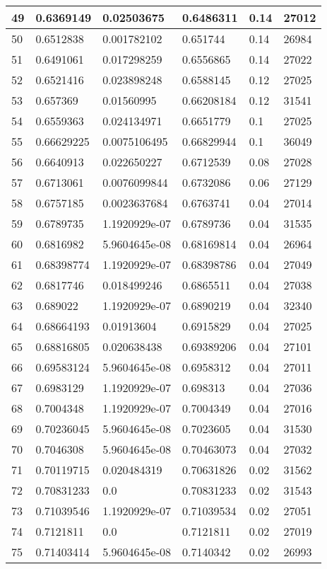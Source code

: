 \begin{longtable}{|l|l|l|l|l|l|}
49 & 0.6369149 & 0.02503675 & 0.6486311 & 0.14 & 27012 \\ \hline 
50 & 0.6512838 & 0.001782102 & 0.651744 & 0.14 & 26984 \\ \hline 
51 & 0.6491061 & 0.017298259 & 0.6556865 & 0.14 & 27022 \\ \hline 
52 & 0.6521416 & 0.023898248 & 0.6588145 & 0.12 & 27025 \\ \hline 
53 & 0.657369 & 0.01560995 & 0.66208184 & 0.12 & 31541 \\ \hline 
54 & 0.6559363 & 0.024134971 & 0.6651779 & 0.1 & 27025 \\ \hline 
55 & 0.66629225 & 0.0075106495 & 0.66829944 & 0.1 & 36049 \\ \hline 
56 & 0.6640913 & 0.022650227 & 0.6712539 & 0.08 & 27028 \\ \hline 
57 & 0.6713061 & 0.0076099844 & 0.6732086 & 0.06 & 27129 \\ \hline 
58 & 0.6757185 & 0.0023637684 & 0.6763741 & 0.04 & 27014 \\ \hline 
59 & 0.6789735 & 1.1920929e-07 & 0.6789736 & 0.04 & 31535 \\ \hline 
60 & 0.6816982 & 5.9604645e-08 & 0.68169814 & 0.04 & 26964 \\ \hline 
61 & 0.68398774 & 1.1920929e-07 & 0.68398786 & 0.04 & 27049 \\ \hline 
62 & 0.6817746 & 0.018499246 & 0.6865511 & 0.04 & 27038 \\ \hline 
63 & 0.689022 & 1.1920929e-07 & 0.6890219 & 0.04 & 32340 \\ \hline 
64 & 0.68664193 & 0.01913604 & 0.6915829 & 0.04 & 27025 \\ \hline 
65 & 0.68816805 & 0.020638438 & 0.69389206 & 0.04 & 27101 \\ \hline 
66 & 0.69583124 & 5.9604645e-08 & 0.6958312 & 0.04 & 27011 \\ \hline 
67 & 0.6983129 & 1.1920929e-07 & 0.698313 & 0.04 & 27036 \\ \hline 
68 & 0.7004348 & 1.1920929e-07 & 0.7004349 & 0.04 & 27016 \\ \hline 
69 & 0.70236045 & 5.9604645e-08 & 0.7023605 & 0.04 & 31530 \\ \hline 
70 & 0.7046308 & 5.9604645e-08 & 0.70463073 & 0.04 & 27032 \\ \hline 
71 & 0.70119715 & 0.020484319 & 0.70631826 & 0.02 & 31562 \\ \hline 
72 & 0.70831233 & 0.0 & 0.70831233 & 0.02 & 31543 \\ \hline 
73 & 0.71039546 & 1.1920929e-07 & 0.71039534 & 0.02 & 27051 \\ \hline 
74 & 0.7121811 & 0.0 & 0.7121811 & 0.02 & 27019 \\ \hline 
75 & 0.71403414 & 5.9604645e-08 & 0.7140342 & 0.02 & 26993 \\ \hline 
\end{longtable}